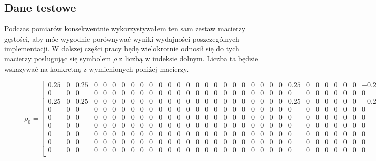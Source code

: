 \documentclass[11pt, a4paper]{article}
\begin{document}
\begin{sloppypar}
    \newpage


    \subsection{Dane testowe}


    Podczas pomiarów konsekwentnie wykorzystywałem ten sam zestaw macierzy gęstości, aby
    móc wygodnie porównywać wyniki wydajności poszczególnych implementacji. W dalszej
    części pracy będę wielokrotnie odnosił się do tych macierzy posługując się symbolem
    $\rho$ z liczbą w indeksie dolnym. Liczba ta będzie wskazywać na konkretną z wymienionych
    poniżej macierzy.

    \FloatBarrier
    \begin{figure}[ht]
      \centering
      \setcounter{MaxMatrixCols}{33}
      \[
        \rho_{0}= \left[
        \begin{smallmatrix}
          0.25  & 0 & 0.25  & 0 & 0 & 0 & 0 & 0 & 0 & 0 & 0 & 0 & 0 & 0 & 0 & 0 & 0 & 0 & 0 & 0 & 0 & 0 & 0 & 0 & 0.25  & 0 & 0 & 0 & 0 & 0 & 0 & -0.25 \\
          0     & 0 & 0     & 0 & 0 & 0 & 0 & 0 & 0 & 0 & 0 & 0 & 0 & 0 & 0 & 0 & 0 & 0 & 0 & 0 & 0 & 0 & 0 & 0 & 0     & 0 & 0 & 0 & 0 & 0 & 0 & 0     \\
          0.25  & 0 & 0.25  & 0 & 0 & 0 & 0 & 0 & 0 & 0 & 0 & 0 & 0 & 0 & 0 & 0 & 0 & 0 & 0 & 0 & 0 & 0 & 0 & 0 & 0.25  & 0 & 0 & 0 & 0 & 0 & 0 & -0.25 \\
          0     & 0 & 0     & 0 & 0 & 0 & 0 & 0 & 0 & 0 & 0 & 0 & 0 & 0 & 0 & 0 & 0 & 0 & 0 & 0 & 0 & 0 & 0 & 0 & 0     & 0 & 0 & 0 & 0 & 0 & 0 & 0     \\
          0     & 0 & 0     & 0 & 0 & 0 & 0 & 0 & 0 & 0 & 0 & 0 & 0 & 0 & 0 & 0 & 0 & 0 & 0 & 0 & 0 & 0 & 0 & 0 & 0     & 0 & 0 & 0 & 0 & 0 & 0 & 0     \\
          0     & 0 & 0     & 0 & 0 & 0 & 0 & 0 & 0 & 0 & 0 & 0 & 0 & 0 & 0 & 0 & 0 & 0 & 0 & 0 & 0 & 0 & 0 & 0 & 0     & 0 & 0 & 0 & 0 & 0 & 0 & 0     \\
          0     & 0 & 0     & 0 & 0 & 0 & 0 & 0 & 0 & 0 & 0 & 0 & 0 & 0 & 0 & 0 & 0 & 0 & 0 & 0 & 0 & 0 & 0 & 0 & 0     & 0 & 0 & 0 & 0 & 0 & 0 & 0     \\
          0     & 0 & 0     & 0 & 0 & 0 & 0 & 0 & 0 & 0 & 0 & 0 & 0 & 0 & 0 & 0 & 0 & 0 & 0 & 0 & 0 & 0 & 0 & 0 & 0     & 0 & 0 & 0 & 0 & 0 & 0 & 0     \\
          0     & 0 & 0     & 0 & 0 & 0 & 0 & 0 & 0 & 0 & 0 & 0 & 0 & 0 & 0 & 0 & 0 & 0 & 0 & 0 & 0 & 0 & 0 & 0 & 0     & 0 & 0 & 0 & 0 & 0 & 0 & 0     \\

\end{smallmatrix}\]
\end{figure}
\end{sloppypar}
\end{document}
